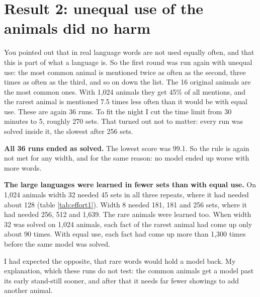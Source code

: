 \section{Result 2: unequal use of the animals did no harm}
\label{sec:zipf}

You pointed out that in real language words are not used equally often, and that this is part
of what a language is. So the first round was run again with unequal use: the most
common animal is mentioned twice as often as the second, three times as often as the third,
and so on down the list. The 16 original animals are the most common ones. With 1,024 animals
they get 45\% of all mentions, and the rarest animal is mentioned 7.5 times less often than it
would be with equal use. These are again 36 runs. To fit the night I cut the time limit from 30
minutes to 5, roughly 270 sets. That turned out not to matter: every run was solved inside it,
the slowest after 256 sets.

\textbf{All 36 runs ended as solved.} The lowest score was 99.1. So the rule is again not met
for any width, and for the same reason: no model ended up worse with more words.

\textbf{The large languages were learned in fewer sets than with equal use.} On 1,024 animals
width 32 needed 45 sets in all three repeats, where it had needed about 128 (table
\ref{tab:effort1}). Width 8 needed 181, 181 and 256 sets, where it had needed 256, 512 and
1,639. The rare
animals were learned too. When width 32 was solved on 1,024 animals, each fact of the rarest
animal had come up only about 90 times. With equal use, each fact had come up more than 1,300
times before the same model was solved.

I had expected the opposite, that rare words would hold a model back. My explanation, which
these runs do not test: the common animals get a model past its early stand-still sooner, and
after that it needs far fewer showings to add another animal.
